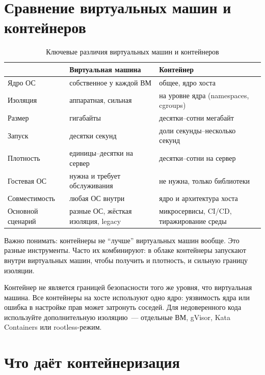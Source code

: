 \section{Сравнение виртуальных машин и контейнеров}

\begin{table}[htbp]
\centering
\small
\begin{tabularx}{\textwidth}{@{}lXX@{}}
\toprule
 & \textbf{Виртуальная машина} & \textbf{Контейнер} \\
\midrule
Ядро ОС & собственное у каждой ВМ & общее, ядро хоста \\
Изоляция & аппаратная, сильная & на уровне ядра (namespaces, cgroups) \\
Размер & гигабайты & десятки--сотни мегабайт \\
Запуск & десятки секунд & доли секунды--несколько секунд \\
Плотность & единицы--десятки на сервер & десятки--сотни на сервер \\
Гостевая ОС & нужна и требует обслуживания & не нужна, только библиотеки \\
Совместимость & любая ОС внутри & ядро и архитектура хоста \\
Основной сценарий & разные ОС, жёсткая изоляция, legacy & микросервисы, CI/CD, тиражирование среды \\
\bottomrule
\end{tabularx}
\caption{Ключевые различия виртуальных машин и контейнеров}\label{tab:vm-vs-ct}
\end{table}

Важно понимать: контейнеры не \enquote{лучше} виртуальных машин вообще.
Это разные инструменты. Часто их комбинируют: в облаке контейнеры
запускают внутри виртуальных машин, чтобы получить и плотность,
и сильную границу изоляции.

\begin{warnbox}
Контейнер не является границей безопасности того же уровня, что виртуальная
машина. Все контейнеры на хосте используют одно ядро: уязвимость ядра
или ошибка в настройке прав может затронуть соседей. Для недоверенного
кода используйте дополнительную изоляцию~--- отдельные ВМ, gVisor, Kata
Containers или rootless-режим.
\end{warnbox}

\section{Что даёт контейнеризация}

